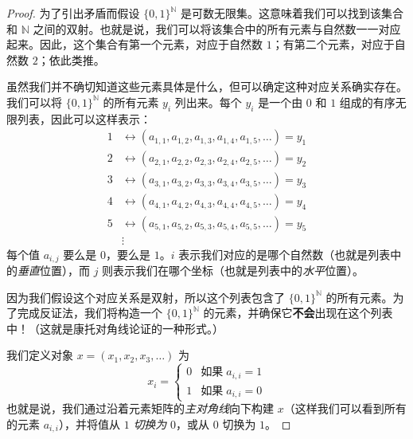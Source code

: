 \begin{proof}
    为了引出矛盾而假设 $\{0, 1\}^{\mathbb{N}}$ 是可数无限集。这意味着我们可以找到该集合和 $\mathbb{N}$ 之间的双射。也就是说，我们可以将该集合中的所有元素与自然数一一对应起来。因此，这个集合有第一个元素，对应于自然数 $1$；有第二个元素，对应于自然数 $2$；依此类推。

    虽然我们并不确切知道这些元素具体是什么，但可以确定这种对应关系确实存在。我们可以将 $\{0, 1\}^{\mathbb{N}}$ 的所有元素 $y_i$ 列出来。每个 $y_i$ 是一个由 $0$ 和 $1$ 组成的有序无限列表，因此可以这样表示：
    \begin{align*}
        1 & \leftrightarrow (a_{1,1} , a_{1,2} , a_{1,3} , a_{1,4} , a_{1,5} , \dots) = y_1 \\
        2 & \leftrightarrow (a_{2,1} , a_{2,2} , a_{2,3} , a_{2,4} , a_{2,5} , \dots) = y_2 \\
        3 & \leftrightarrow (a_{3,1} , a_{3,2} , a_{3,3} , a_{3,4} , a_{3,5} , \dots) = y_3 \\
        4 & \leftrightarrow (a_{4,1} , a_{4,2} , a_{4,3} , a_{4,4} , a_{4,5} , \dots) = y_4 \\
        5 & \leftrightarrow (a_{5,1} , a_{5,2} , a_{5,3} , a_{5,4} , a_{5,5} , \dots) = y_5 \\
          & \vdots
    \end{align*}
    每个值 $a_{i,j}$ 要么是 $0$，要么是 $1$。$i$ 表示我们对应的是哪个自然数（也就是列表中的\emph{垂直}位置），而 $j$ 则表示我们在哪个坐标（也就是列表中的\emph{水平}位置）。

    因为我们假设这个对应关系是双射，所以这个列表包含了 $\{0, 1\}^{\mathbb{N}}$ 的所有元素。为了完成反证法，我们将构造一个 $\{0, 1\}^{\mathbb{N}}$ 的元素，并确保它\textbf{不会}出现在这个列表中！（这就是康托对角线论证的一种形式。）

    我们定义对象 $x = (x_1, x_2, x_3, \dots)$ 为
    \[x_i = \begin{cases}
            0 & \text{如果}\; a_{i,i} = 1 \\
            1 & \text{如果}\; a_{i,i} = 0
        \end{cases}\]
    也就是说，我们通过沿着元素矩阵的\emph{主对角线}向下构建 $x$（这样我们可以看到所有的元素 $a_{i,i}$），并将值从 $1$ \emph{切换为} $0$，或从 $0$ 切换为 $1$。


\end{proof}

